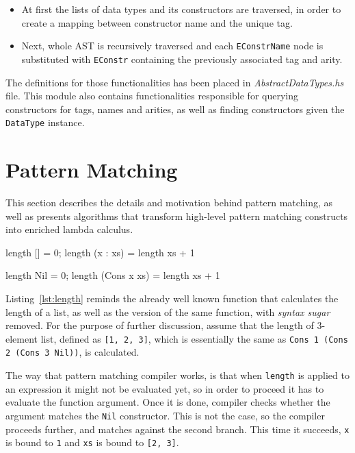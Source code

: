 \documentclass[12pt,a4paper]{report}
\begin{document}
\begin{itemize}
  \item At first the lists of data types and its constructors are traversed, in
    order to create a mapping between constructor name and the unique tag.
  \item Next, whole AST is recursively traversed and each \texttt{EConstrName}
    node is substituted with \texttt{EConstr} containing the previously
    associated tag and arity.
\end{itemize}

The definitions for those functionalities has been placed in
\textit{AbstractDataTypes.hs} file. This module also contains functionalities
responsible for querying constructors for tags, names and arities, as well as
finding constructors given the \texttt{DataType} instance.


\section{Pattern Matching}
This section describes the details and motivation behind pattern matching, as
well as presents algorithms that transform high-level pattern matching
constructs into enriched lambda calculus.

\vspace*{0.2in}
\begin{code}[style=haskell,label=lst:length,caption={Calculating length of a list.}]
length [] = 0;
length (x : xs) = length xs + 1

length Nil = 0;
length (Cons x xs) = length xs + 1
\end{code}

Listing~\ref{lst:length} reminds the already well known function that
calculates the length of a list, as well as the version of the same function,
with \textit{syntax sugar} removed. For the purpose of further discussion,
assume that the length of 3-element list, defined as \texttt{[1, 2, 3]}, which
is essentially the same as \texttt{Cons 1 (Cons 2 (Cons 3 Nil))}, is
calculated.

The way that pattern matching compiler works, is that when \texttt{length} is
applied to an expression it might not be evaluated yet, so in order to proceed
it has to evaluate the function argument. Once it is done, compiler checks
whether the argument matches the \texttt{Nil} constructor. This is not the case, so
the compiler proceeds further, and matches against the second branch. This time it
succeeds, \texttt{x} is bound to \texttt{1} and \texttt{xs} is bound to
\texttt{[2, 3]}.
\end{document}
